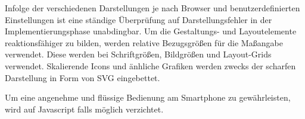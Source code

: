 Infolge der verschiedenen Darstellungen je nach Browser und
benutzerdefinierten Einstellungen ist eine ständige Überprüfung auf
Darstellungsfehler in der Implementierungsphase unabdingbar.
Um die Gestaltungs- und Layoutelemente reaktionsfähiger zu bilden, werden
relative Bezugsgrößen für die Maßangabe verwendet. Diese werden \zB bei
Schriftgrößen, Bildgrößen und Layout-Grids verwendet. Skalierende Icons und 
änhliche Grafiken werden zwecks der scharfen Darstellung in Form von \ac{SVG}
eingebettet.

Um eine angenehme und flüssige Bedienung am Smartphone zu gewährleisten, wird
auf Javascript falls möglich verzichtet.

